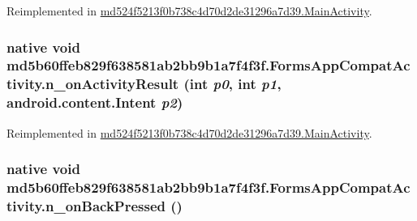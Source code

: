Reimplemented in \hyperlink{classmd524f5213f0b738c4d70d2de31296a7d39_1_1_main_activity_f04a2a3f5702e57b79b001a0d63ef0d8}{md524f5213f0b738c4d70d2de31296a7d39.MainActivity}.\hypertarget{classmd5b60ffeb829f638581ab2bb9b1a7f4f3f_1_1_forms_app_compat_activity_9a3a9d2f993a2d3b98d65006ed85bd7c}{
\subsubsection[{n\_\-onActivityResult}]{\setlength{\rightskip}{0pt plus 5cm}native void md5b60ffeb829f638581ab2bb9b1a7f4f3f.FormsAppCompatActivity.n\_\-onActivityResult (int {\em p0}, \/  int {\em p1}, \/  android.content.Intent {\em p2})}}
\label{classmd5b60ffeb829f638581ab2bb9b1a7f4f3f_1_1_forms_app_compat_activity_9a3a9d2f993a2d3b98d65006ed85bd7c}




Reimplemented in \hyperlink{classmd524f5213f0b738c4d70d2de31296a7d39_1_1_main_activity_e6a325dab3576afac11530dd570d4f4c}{md524f5213f0b738c4d70d2de31296a7d39.MainActivity}.\hypertarget{classmd5b60ffeb829f638581ab2bb9b1a7f4f3f_1_1_forms_app_compat_activity_900a0e82430d75a18dc20857da07f061}{
\subsubsection[{n\_\-onBackPressed}]{\setlength{\rightskip}{0pt plus 5cm}native void md5b60ffeb829f638581ab2bb9b1a7f4f3f.FormsAppCompatActivity.n\_\-onBackPressed ()}}
\label{classmd5b60ffeb829f638581ab2bb9b1a7f4f3f_1_1_forms_app_compat_activity_900a0e82430d75a18dc20857da07f061}


